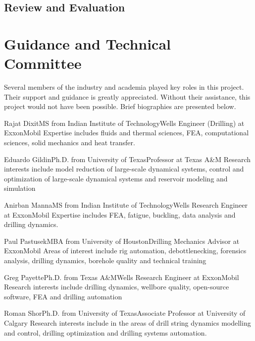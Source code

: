 \subsection{Review and Evaluation}
\notfinished{}

\section{Guidance and Technical Committee}
Several members of the industry and academia played key roles in this project.  Their support and guidance is greatly appreciated.  Without their assistance, this project would not have been possible.  Brief biographies are presented below.

\begin{committeemember}{Rajat Dixit}{MS from Indian Institute of Technology}{Wells Engineer (Drilling) at ExxonMobil}
Expertise includes fluids and thermal sciences, FEA, computational sciences, solid mechanics and heat transfer.
\end{committeemember}

\begin{committeemember}{Eduardo Gildin}{Ph.D. from University of Texas}{Professor at Texas A\&M}
Research interests include model reduction of large-scale dynamical systems, control and optimization of large-scale dynamical systems and reservoir modeling and simulation
\end{committeemember}

\begin{committeemember}{Anirban Manna}{MS from Indian Institute of Technology}{Wells Research Engineer at ExxonMobil}
Expertise includes FEA, fatigue, buckling, data analysis and drilling dynamics.
\end{committeemember}

\begin{committeemember}{Paul Pastusek}{MBA from University of Houston}{Drilling Mechanics Advisor at ExxonMobil}
Areas of interest include rig automation, debottlenecking, forensics analysis, drilling dynamics, borehole quality and technical training
\end{committeemember}

\begin{committeemember}{Greg Payette}{Ph.D. from Texas A\&M}{Wells Research Engineer at ExxonMobil}
Research interests include drilling dynamics, wellbore quality, open-source software, FEA and drilling automation
\end{committeemember}

\begin{committeemember}{Roman Shor}{Ph.D. from University of Texas}{Associate Professor at University of Calgary}
Research interests include in the areas of drill string dynamics modelling and control, drilling optimization and drilling systems automation.
\end{committeemember}





